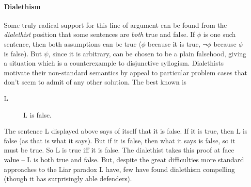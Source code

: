 \paragraph{Dialethism} Some truly radical support for this line of argument can be found from the \emph{dialethist} position that some sentences are \emph{both} true and false. If $\phi$ is one such sentence, then both assumptions can be true ($\phi$ because it is true, $\neg\phi$ because $\phi$ is false). But $\psi$, since it is arbitrary, can be chosen to be a plain falsehood, giving a situation  which is a counterexample to disjunctive syllogism. Dialethists motivate their non-standard semantics by appeal to particular problem cases that don't seem to admit of any other solution. The best known is \begin{description}
	\item [L] L is false.
\end{description} The sentence L displayed above says of itself that it is false. If it is true, then L is false (as that is what it says). But if it is false, then what it says is false, so it must be true. So L is true iff it is false. The dialethist takes this proof at face value – L is both true and false. But, despite the great difficulties more standard approaches to the Liar paradox L have, few have found dialethism compelling (though it has surprisingly able defenders). 

